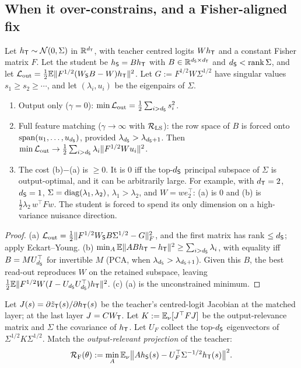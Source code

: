 \subsection{When it over-constrains, and a Fisher-aligned fix}

\begin{theorem}\label{thm:overconstraint}
\Mo\Ck Let $h_{\mathsf{T}}\sim\mathcal{N}(0,\Sigma)$ in $\mathbb{R}^{d_{\mathsf{T}}}$, with teacher centred logits $Wh_{\mathsf{T}}$ and a constant Fisher matrix $F$.
Let the student be $h_{\mathsf{S}}=Bh_{\mathsf{T}}$ with $B\in\mathbb{R}^{d_{\mathsf{S}}\times d_{\mathsf{T}}}$ and $d_{\mathsf{S}}<\operatorname{rank}\Sigma$, and let
$\mathcal{L}_{\mathrm{out}}=\frac12\mathbb{E}\|F^{1/2}(W_{\mathsf{S}} B-W)h_{\mathsf{T}}\|^2$. Let $G:=F^{1/2}W\Sigma^{1/2}$ have singular values
$s_1\ge s_2\ge\cdots$, and let $(\lambda_i,u_i)$ be the eigenpairs of $\Sigma$.
\begin{enumerate}[label=(\alph*),nosep]
\item Output only ($\gamma=0$): $\min\mathcal{L}_{\mathrm{out}}=\frac12\sum_{i>d_{\mathsf{S}}}s_i^2$.
\item Full feature matching ($\gamma\to\infty$ with $\mathcal{R}_{\mathrm{LS}}$): the row space of $B$ is forced onto
$\operatorname{span}(u_1,\dots,u_{d_{\mathsf{S}}})$, provided $\lambda_{d_{\mathsf{S}}}>\lambda_{d_{\mathsf{S}}+1}$. Then
$\min\mathcal{L}_{\mathrm{out}}\to\frac12\sum_{i>d_{\mathsf{S}}}\lambda_i\|F^{1/2}Wu_i\|^2$.
\item The cost (b)$-$(a) is $\ge0$. It is $0$ iff the top-$d_{\mathsf{S}}$ principal subspace of $\Sigma$ is output-optimal,
and it can be arbitrarily large. For example, with $d_{\mathsf{T}}=2$, $d_{\mathsf{S}}=1$, $\Sigma=\operatorname{diag}(\lambda_1,\lambda_2)$,
$\lambda_1>\lambda_2$, and $W=we_2^\top$: (a) is $0$ and (b) is $\frac12\lambda_2\,w^\top Fw$. The student is forced to
spend its only dimension on a high-variance nuisance direction.
\end{enumerate}
\end{theorem}
\begin{proof}
(a) $\mathcal{L}_{\mathrm{out}}=\frac12\|F^{1/2}W_{\mathsf{S}} B\Sigma^{1/2}-G\|_F^2$, and the first matrix has rank $\le d_{\mathsf{S}}$; apply
Eckart--Young. (b) $\min_A\mathbb{E}\|ABh_{\mathsf{T}}-h_{\mathsf{T}}\|^2\ge\sum_{i>d_{\mathsf{S}}}\lambda_i$, with equality iff $B=MU_{d_{\mathsf{S}}}^\top$ for
invertible $M$ (PCA, when $\lambda_{d_{\mathsf{S}}}>\lambda_{d_{\mathsf{S}}+1}$). Given this $B$, the best read-out reproduces $W$ on the
retained subspace, leaving $\frac12\mathbb{E}\|F^{1/2}W(I-U_{d_{\mathsf{S}}}U_{d_{\mathsf{S}}}^\top)h_{\mathsf{T}}\|^2$. (c) (a) is the unconstrained
minimum.
\end{proof}

\begin{definition}\label{def:fisher-rep}
Let $J(s)=\partial\tilde z_{\mathsf{T}}(s)/\partial h_{\mathsf{T}}(s)$ be the teacher's centred-logit Jacobian at the matched
layer; at the last layer $J=CW_{\mathsf{T}}$. Let $K:=\mathbb{E}_\nu[J^\top F J]$ be the output-relevance matrix and $\Sigma$ the
covariance of $h_{\mathsf{T}}$. Let $U_F$ collect the top-$d_{\mathsf{S}}$ eigenvectors of $\Sigma^{1/2}K\Sigma^{1/2}$. Match the
\emph{output-relevant projection} of the teacher:
\[
\mathcal{R}_{\mathrm F}(\theta):=\min_A\mathbb{E}_\nu\big\|Ah_{\mathsf{S}}(s)-U_F^\top\Sigma^{-1/2}h_{\mathsf{T}}(s)\big\|^2 .
\]
\end{definition}


